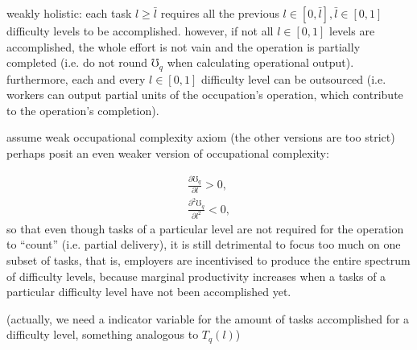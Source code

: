 \documentclass[hidelinks, nonatbib]{elsarticle}
\begin{document}
weakly holistic: each task $l \geq \bar{l}$ requires all the previous $l \in [0, \bar{l}], \bar{l} \in [0,1]$ difficulty levels to be accomplished. however, if not all $l \in [0,1]$ levels are accomplished, the whole effort is not vain and the operation is partially completed (i.e. do not round $\mho_q$ when calculating operational output). furthermore, each and every $l \in [0,1]$ difficulty level can be outsourced (i.e. workers can output partial units of the occupation's operation, which contribute to the operation's completion).

assume weak occupational complexity axiom (the other versions are too strict)
perhaps posit an even weaker version of occupational complexity:

\begin{gather}
    \frac{
        \partial \mho_{q}
    }{
        \partial l
    } > 0
    ,\\
    \frac{
        \partial^2 \mho_{q}
    }{
        \partial l^2
    } < 0
    ,
\end{gather}
so that even though tasks of a particular level are not required for the operation to ``count'' (i.e. partial delivery), it is still detrimental to focus too much on one subset of tasks, that is, employers are incentivised to produce the entire spectrum of difficulty levels, because marginal productivity increases when a tasks of a particular difficulty level have not been accomplished yet.

(actually, we need a indicator variable for the amount of tasks accomplished for a difficulty level, something analogous to $T_q(l)$)
\end{document}
